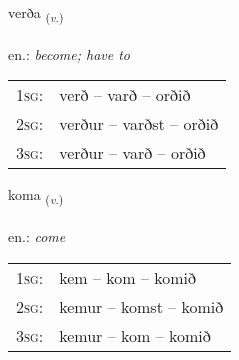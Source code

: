 \documentclass[frontgrid, backgrid]{flacards}\usepackage[]{graphicx}\usepackage[]{xcolor}
\begin{document}
{verða \small{\textsubscript{(\textit{v.})}} \\[1ex] %
\textphonetic{[vɛrða]} \\
en.: \emph{become; have to} \\  [2ex]
\renewcommand*{\arraystretch}{0.8}
\begin{tabular}{p{1cm}l}
\textsc{1sg}: & verð -- varð -- orðið \\ 
\textsc{2sg}: & verður -- varðst -- orðið \\ 
\textsc{3sg}: & verður -- varð -- orðið \\ 
\end{tabular}
}

\renewcommand{\flhead}{\vskip5pt \fboxsep=0pt {\small\bfseries\footnotesize Sagnorð | Verb}}
\renewcommand{\fcfoot}{\vskip5pt \fboxsep=0pt \hspace{2pt}{\small\bfseries\footnotesize 1K}}

\renewcommand{\blhead}{\vskip5pt {\small\bfseries\footnotesize Sagnorð | Verb }}
\renewcommand{\bcfoot}{\vskip5pt \hspace{2pt}{\small\bfseries\footnotesize 1K}}


{koma \small{\textsubscript{(\textit{v.})}} \\[1ex] %
\textphonetic{[kʰɔːma]} \\
en.: \emph{come} \\  [2ex]
\renewcommand*{\arraystretch}{0.8}
\begin{tabular}{p{1cm}l}
\textsc{1sg}: & kem -- kom -- komið \\ 
\textsc{2sg}: & kemur -- komst -- komið \\ 
\textsc{3sg}: & kemur -- kom -- komið \\ 
\end{tabular}
}

\renewcommand{\flhead}{\vskip5pt \fboxsep=0pt {\small\bfseries\footnotesize Fornafn | Pronoun}}
\renewcommand{\fcfoot}{\vskip5pt \fboxsep=0pt \hspace{2pt}{\small\bfseries\footnotesize 1K}}
\end{document}
